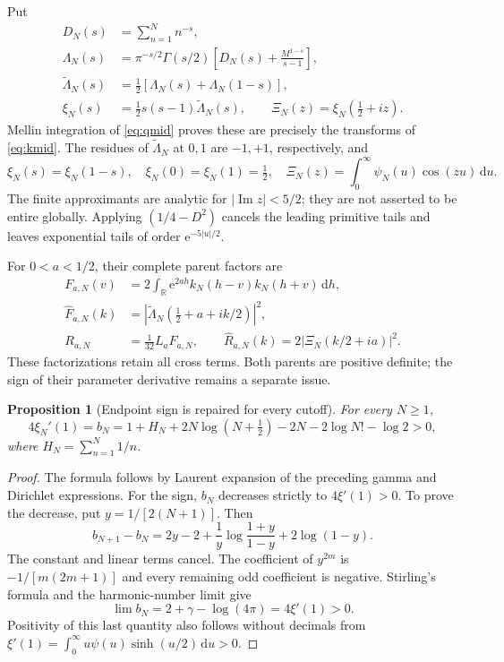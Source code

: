 \documentclass[11pt,letterpaper]{article}
\numberwithin{equation}{section}
\newtheorem{proposition}[theorem]{Proposition}
\theoremstyle{remark}\newtheorem{remark}[theorem]{Remark}
\newcommand{\R}{\mathbb R}
\newcommand{\dd}{\,\mathrm d}
\newcommand{\ee}{\mathrm e}
\newcommand{\Impart}{\operatorname{Im}}
\begin{document}
Put
\begin{align}
D_N(s)&=\sum_{n=1}^N n^{-s},\\
\Lambda_N(s)&=\pi^{-s/2}\Gamma(s/2)
\left[D_N(s)+\frac{M^{1-s}}{s-1}\right],\\
\widetilde\Lambda_N(s)&=\tfrac12[\Lambda_N(s)+\Lambda_N(1-s)],\\
\xi_N(s)&=\tfrac12s(s-1)\widetilde\Lambda_N(s),
\qquad \Xi_N(z)=\xi_N(\tfrac12+iz).
\end{align}
Mellin integration of \eqref{eq:qmid} proves these are precisely the transforms of \eqref{eq:kmid}. The residues of $\widetilde\Lambda_N$ at $0,1$ are $-1,+1$, respectively, and
\begin{equation}\label{eq:endpoints}
\xi_N(s)=\xi_N(1-s),\quad \xi_N(0)=\xi_N(1)=\tfrac12,
\quad \Xi_N(z)=\int_0^\infty\psi_N(u)\cos(zu)\dd u.
\end{equation}
The finite approximants are analytic for $|\Impart z|<5/2$; they are not asserted to be entire globally. Applying $(1/4-D^2)$ cancels the leading primitive tails and leaves exponential tails of order $\ee^{-5|u|/2}$.

For $0<a<1/2$, their complete parent factors are
\begin{align}
F_{a,N}(v)&=2\int_{\R}\ee^{2ah}k_N(h-v)k_N(h+v)\dd h,\\
\widehat F_{a,N}(k)&=|\widetilde\Lambda_N(\tfrac12+a+ik/2)|^2,\\
R_{a,N}&=\tfrac1{32}L_aF_{a,N},\qquad
\widehat R_{a,N}(k)=2|\Xi_N(k/2+ia)|^2.\label{eq:midfactors}
\end{align}
These factorizations retain all cross terms. Both parents are positive definite; the sign of their parameter derivative remains a separate issue.

\begin{proposition}[Endpoint sign is repaired for every cutoff]\label{prop:endpoint}
For every $N\ge1$,
\begin{equation}\label{eq:endpointslope}
4\xi_N'(1)=b_N
=1+H_N+2N\log(N+\tfrac12)-2N-2\log N!-\log2>0,
\end{equation}
where $H_N=\sum_{n=1}^N1/n$.
\end{proposition}
\begin{proof}
The formula follows by Laurent expansion of the preceding gamma and Dirichlet expressions. For the sign, $b_N$ decreases strictly to $4\xi'(1)>0$. To prove the decrease, put $y=1/[2(N+1)]$. Then
\[
b_{N+1}-b_N
=2y-2+\frac1y\log\frac{1+y}{1-y}+2\log(1-y).
\]
The constant and linear terms cancel. The coefficient of $y^{2m}$ is $-1/[m(2m+1)]$ and every remaining odd coefficient is negative. Stirling's formula and the harmonic-number limit give
\[
\lim b_N=2+\gamma-\log(4\pi)=4\xi'(1)>0.
\]
Positivity of this last quantity also follows without decimals from
$\xi'(1)=\int_0^\infty u\psi(u)\sinh(u/2)\dd u>0$.
\end{proof}
\end{document}
